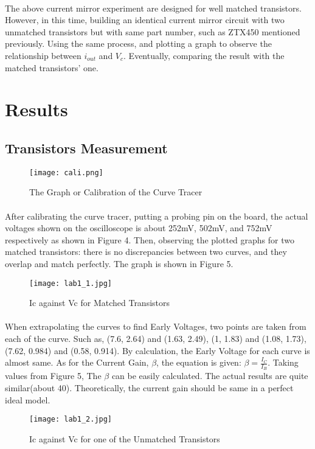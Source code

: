 \documentclass[12pt]{article}
\begin{document}
    \paragraph{}
    The above current mirror experiment are designed for well matched transistors. However, in this time, building an identical current mirror circuit with two unmatched transistors but with same part number, such as ZTX450 mentioned previously. Using the same process, and plotting a graph to observe the relationship between $i_{out}$ and $V_c$. Eventually, comparing the result with the matched transistors' one.
    \section{Results}
    \subsection{Transistors Measurement}
    \begin{figure}[H]
    \centering
    \texttt{[image: cali.png]}
    \caption{The Graph or Calibration of the Curve Tracer}
    \end{figure}
    \paragraph{}
    After calibrating the curve tracer, putting a probing pin on the board, the actual voltages shown on the oscilloscope is about 252mV, 502mV, and 752mV respectively as shown in Figure 4. Then, observing the plotted graphs for two matched transistors: there is no discrepancies between two curves, and they overlap and match perfectly. The graph is shown in Figure 5.
    \begin{figure}[H]
    \centering
    \texttt{[image: lab1\_1.jpg]}
    \caption{Ic against Vc for Matched Transistors}
    \end{figure}
    \paragraph{}
    When extrapolating the curves to find Early Voltages, two points are taken from each of the curve. Such as, (7.6, 2.64) and (1.63, 2.49), (1, 1.83) and (1.08, 1.73), (7.62, 0.984) and (0.58, 0.914). By calculation, the Early Voltage for each curve is almost same. As for the Current Gain, $\beta$, the equation is given: $\beta = \frac{I_C}{I_B}$. Taking values from Figure 5, The $\beta$ can be easily calculated. The actual results are quite similar(about 40). Theoretically, the current gain should be same in a perfect ideal model. 
    \begin{figure}[H]
    \centering
    \texttt{[image: lab1\_2.jpg]}
    \caption{Ic against Vc for one of the Unmatched Transistors}
    \end{figure}
\end{document}
